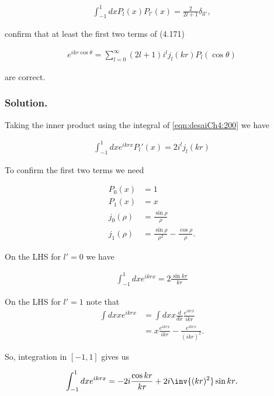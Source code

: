 \begin{align}\label{eqn:desaiCh4:200}
\int_{-1}^1 dx P_l(x) P_{l'}(x) = \frac{2}{2l+1} \delta_{l l'},
\end{align}

confirm that at least the first two terms of (4.171)

\begin{align}\label{eqn:desaiCh4:201}
e^{i k r \cos\theta} = \sum_{l=0}^\infty (2l + 1) i^l j_l(kr) P_l(\cos\theta)
\end{align}

are correct.

\subsubsection{Solution.}

Taking the inner product using the integral of \ref{eqn:desaiCh4:200} we have

\begin{align}\label{eqn:desaiCh4:202}
\int_{-1}^1 dx e^{i k r x} P_l'(x) = 2 i^l j_l(kr) 
\end{align}

To confirm the first two terms we need

\begin{align}\label{eqn:desaiCh4:203}
P_0(x) &= 1 \\
P_1(x) &= x \\
j_0(\rho) &= \frac{\sin\rho}{\rho} \\
j_1(\rho) &= \frac{\sin\rho}{\rho^2} - \frac{\cos\rho}{\rho}.
\end{align}

On the LHS for $l'=0$ we have

\begin{align}\label{eqn:desaiCh4:204}
\int_{-1}^1 dx e^{i k r x} = 2 \frac{\sin{kr}}{kr}
\end{align}

On the LHS for $l'=1$ note that
\begin{align*}
\int dx x e^{i k r x} 
&= 
\int dx x \frac{d}{dx} \frac{e^{i k r x}}{ikr} \\
&= 
x \frac{e^{i k r x}}{ikr} 
- \frac{e^{i k r x}}{(ikr)^2}.
\end{align*}

So, integration in $[-1,1]$ gives us

\begin{align}\label{eqn:desaiCh4:205}
\int_{-1}^1 dx e^{i k r x} =  -2i \frac{\cos{kr}}{kr} + 2i \inv{(kr)^2} \sin{kr}.
\end{align}

